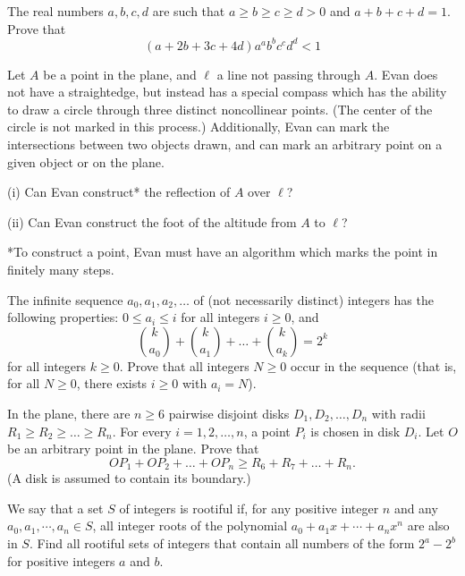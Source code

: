 \documentclass[11pt]{scrartcl}
\begin{document}
\begin{problem}[3813623497653179264]
	The real numbers $a, b, c, d$ are such that $a\geq b\geq c\geq d>0$ and $a+b+c+d=1$. Prove that
\[(a+2b+3c+4d)a^ab^bc^cd^d<1\]
\end{problem}
\begin{problem}[70043882336455]
Let $A$ be a point in the plane, and $\ell$ a line not passing through $A$. Evan does not have a straightedge, but instead has a special compass which has the ability to draw a circle through three distinct noncollinear points. (The center of the circle is not marked in this process.) Additionally, Evan can mark the intersections between two objects drawn, and can mark an arbitrary point on a given object or on the plane.

(i) Can Evan construct* the reflection of $A$ over $\ell$?

(ii) Can Evan construct the foot of the altitude from $A$ to $\ell$?

*To construct a point, Evan must have an algorithm which marks the point in finitely many steps.
\end{problem}
\begin{problem}[2134021625648303394]
The infinite sequence $a_0,a _1, a_2, \dots$ of (not necessarily distinct) integers has the following properties: $0\le a_i \le i$ for all integers $i\ge 0$, and\[\binom{k}{a_0} + \binom{k}{a_1} + \dots + \binom{k}{a_k} = 2^k\]for all integers $k\ge 0$. Prove that all integers $N\ge 0$ occur in the sequence (that is, for all $N\ge 0$, there exists $i\ge 0$ with $a_i=N$).
\end{problem}
\begin{problem}[6654677204410680146]
In the plane, there are $n \geqslant 6$ pairwise disjoint disks $D_{1}, D_{2}, \ldots, D_{n}$ with radii $R_{1} \geqslant R_{2} \geqslant \ldots \geqslant R_{n}$. For every $i=1,2, \ldots, n$, a point $P_{i}$ is chosen in disk $D_{i}$. Let $O$ be an arbitrary point in the plane. Prove that\[O P_{1}+O P_{2}+\ldots+O P_{n} \geqslant R_{6}+R_{7}+\ldots+R_{n}.\](A disk is assumed to contain its boundary.)
\end{problem}
\begin{problem}[4892352754475215646]
	We say that a set $S$ of integers is rootiful if, for any positive integer $n$ and any $a_0, a_1, \cdots, a_n \in S$, all integer roots of the polynomial $a_0+a_1x+\cdots+a_nx^n$ are also in $S$. Find all rootiful sets of integers that contain all numbers of the form $2^a - 2^b$ for positive integers $a$ and $b$.
\end{problem}
\end{document}
